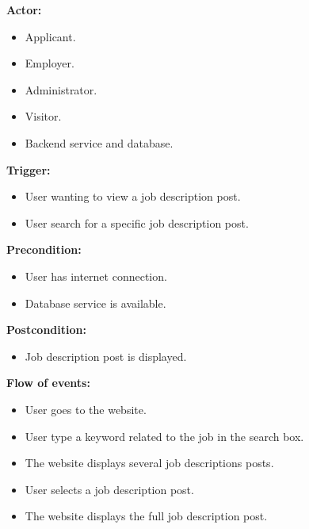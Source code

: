 \documentclass[a4paper]{article}
\begin{document}
\textbf{Actor:}
\begin{itemize}
    \item Applicant.
    \item Employer.
    \item Administrator.
    \item Visitor.
    \item Backend service and database.
\end{itemize}

\textbf{Trigger:}
\begin{itemize}
    \item User wanting to view a job description post.
    \item User search for a specific job description post.
\end{itemize}

\textbf{Precondition:}
\begin{itemize}
    \item User has internet connection.
    \item Database service is available.
\end{itemize}

\textbf{Postcondition:}
\begin{itemize}
    \item Job description post is displayed.
\end{itemize}

\textbf{Flow of events:}
\begin{itemize}
    \item User goes to the website.
    \item User type a keyword related to the job in the search box.
    \item The website displays several job descriptions posts.
    \item User selects a job description post.
    \item The website displays the full job description post.
\end{itemize}
\end{document}
